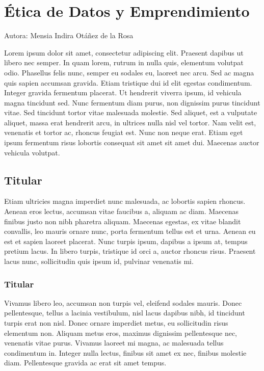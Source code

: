 \documentclass[
  letterpaper,
  DIV=11,
  numbers=noendperiod]{scrreprt}
\begin{document}

\hypertarget{uxe9tica-de-datos-y-emprendimiento}{%
\chapter{Ética de Datos y
Emprendimiento}\label{uxe9tica-de-datos-y-emprendimiento}}

Autora: Mensia Indira Otáñez de la Rosa

Lorem ipsum dolor sit amet, consectetur adipiscing elit. Praesent
dapibus ut libero nec semper. In quam lorem, rutrum in nulla quis,
elementum volutpat odio. Phasellus felis nunc, semper eu sodales eu,
laoreet nec arcu. Sed ac magna quis sapien accumsan gravida. Etiam
tristique dui id elit egestas condimentum. Integer gravida fermentum
placerat. Ut hendrerit viverra ipsum, id vehicula magna tincidunt sed.
Nunc fermentum diam purus, non dignissim purus tincidunt vitae. Sed
tincidunt tortor vitae malesuada molestie. Sed aliquet, est a vulputate
aliquet, massa erat hendrerit arcu, in ultrices nulla nisl vel tortor.
Nam velit est, venenatis et tortor ac, rhoncus feugiat est. Nunc non
neque erat. Etiam eget ipsum fermentum risus lobortis consequat sit amet
sit amet dui. Maecenas auctor vehicula volutpat.

\hypertarget{titular-4}{%
\section{Titular}\label{titular-4}}

Etiam ultricies magna imperdiet nunc malesuada, ac lobortis sapien
rhoncus. Aenean eros lectus, accumsan vitae faucibus a, aliquam ac diam.
Maecenas finibus justo non nibh pharetra aliquam. Maecenas egestas, ex
vitae blandit convallis, leo mauris ornare nunc, porta fermentum tellus
est et urna. Aenean eu est et sapien laoreet placerat. Nunc turpis
ipsum, dapibus a ipsum at, tempus pretium lacus. In libero turpis,
tristique id orci a, auctor rhoncus risus. Praesent lacus nunc,
sollicitudin quis ipsum id, pulvinar venenatis mi.

\hypertarget{titular-5}{%
\subsection{Titular}\label{titular-5}}

Vivamus libero leo, accumsan non turpis vel, eleifend sodales mauris.
Donec pellentesque, tellus a lacinia vestibulum, nisl lacus dapibus
nibh, id tincidunt turpis erat non nisl. Donec ornare imperdiet metus,
eu sollicitudin risus elementum non. Aliquam metus eros, maximus
dignissim pellentesque nec, venenatis vitae purus. Vivamus laoreet mi
magna, ac malesuada tellus condimentum in. Integer nulla lectus, finibus
sit amet ex nec, finibus molestie diam. Pellentesque gravida ac erat sit
amet tempus.
\end{document}
